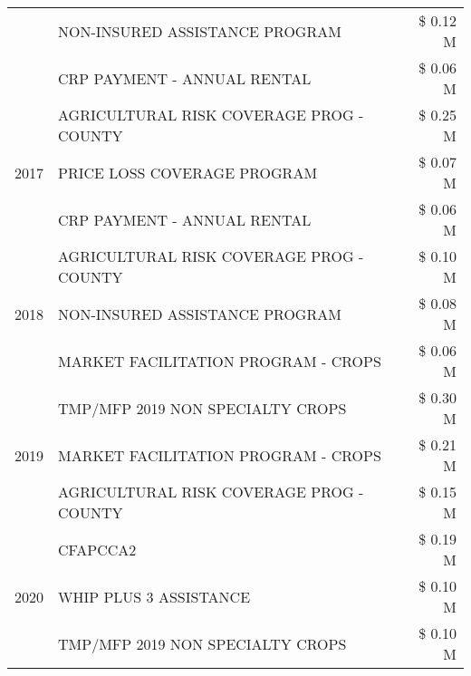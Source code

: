 \begin{tabular}{llr}
 & NON-INSURED ASSISTANCE PROGRAM & \$ 0.12 M \\
 & CRP PAYMENT - ANNUAL RENTAL & \$ 0.06 M \\
\cline{1-3}
\multirow[t]{3}{*}{2017} & AGRICULTURAL RISK COVERAGE PROG - COUNTY & \$ 0.25 M \\
 & PRICE LOSS COVERAGE PROGRAM & \$ 0.07 M \\
 & CRP PAYMENT - ANNUAL RENTAL & \$ 0.06 M \\
\cline{1-3}
\multirow[t]{3}{*}{2018} & AGRICULTURAL RISK COVERAGE PROG - COUNTY & \$ 0.10 M \\
 & NON-INSURED ASSISTANCE PROGRAM & \$ 0.08 M \\
 & MARKET FACILITATION PROGRAM - CROPS & \$ 0.06 M \\
\cline{1-3}
\multirow[t]{3}{*}{2019} & TMP/MFP 2019 NON SPECIALTY CROPS & \$ 0.30 M \\
 & MARKET FACILITATION PROGRAM - CROPS & \$ 0.21 M \\
 & AGRICULTURAL RISK COVERAGE PROG - COUNTY & \$ 0.15 M \\
\cline{1-3}
\multirow[t]{3}{*}{2020} & CFAPCCA2 & \$ 0.19 M \\
 & WHIP PLUS 3 ASSISTANCE & \$ 0.10 M \\
 & TMP/MFP 2019 NON SPECIALTY CROPS & \$ 0.10 M \\
\cline{1-3}
\bottomrule
\end{tabular}
